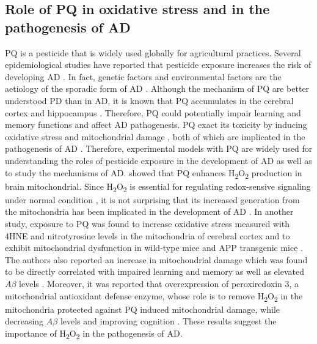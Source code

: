 \subsection{Role of PQ in oxidative stress and in the pathogenesis of AD}
PQ is a pesticide that is widely used globally for agricultural practices. Several epidemiological studies have reported that pesticide exposure increases the risk of developing AD \citep{Baldi2003,Hayden2010,Santibanez2007,Yan2016}. In fact, genetic factors and environmental factors are the aetiology of the sporadic form of AD \citep{Landrigan2005}. Although the mechanism of PQ are better understood PD than in AD, it is known that PQ accumulates in the cerebral cortex and hippocampus \citep{Landrigan2005}. Therefore, PQ could potentially impair learning and memory functions and affect AD pathogenesis. PQ exact its toxicity by inducing oxidative stress and mitochondrial damage \citep{Baltazar2014,Drechsel2008,Lin2006}, both of which are implicated in the pathogenesis of AD \citep{Lin2006}. Therefore, experimental models with PQ are widely used for understanding the roles of pesticide exposure in the development of AD as well as to study the mechanisms of AD. \citet{Drechsel2008} showed that PQ enhances H\textsubscript{2}O\textsubscript{2} production in brain mitochondrial. Since H\textsubscript{2}O\textsubscript{2} is essential for regulating redox-sensive signaling under normal condition \citep{Rhee2006}, it is not surprising that its increased generation from the mitochondria has been implicated in the development of AD \citep{Du2008,Manczak2006}. In another study, exposure to PQ was found to increase oxidative stress measured with 4HNE and nitrotyrosine levels in the mitochondria of cerebral cortex and to exhibit mitochondrial dysfunction in wild-type mice and APP transgenic mice \citep{Chen2012}. The authors also reported an increase in mitochondrial damage which was found to be directly correlated with impaired learning and memory as well as elevated $A\beta$ levels \citep{Chen2012}. Moreover, it was reported that overexpression of peroxiredoxin 3, a mitochondrial antioxidant defense enzyme, whose role is to remove H\textsubscript{2}O\textsubscript{2} in the mitochondria protected against PQ induced mitochondrial damage, while decreasing $A\beta$ levels and improving cognition \citep{Chen2012}. These results suggest the importance of H\textsubscript{2}O\textsubscript{2} in the pathogenesis of AD.

